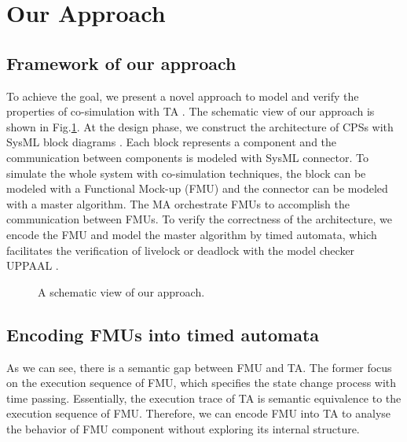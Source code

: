 \section{Our Approach}
\subsection{Framework of our approach}
To achieve the goal, we present a novel approach to model and verify the properties of co-simulation with TA \cite{AlurD94}. The schematic view of our approach is shown in Fig.\ref{paper-arc}. At the design phase, we construct the architecture of CPSs with SysML block diagrams \cite{RahimHI17}. Each block represents a component and the communication between components is modeled with SysML connector. To simulate the whole system with co-simulation techniques, the block can be modeled with a Functional Mock-up (FMU) and the connector can be modeled with a master algorithm. The MA orchestrate FMUs to accomplish the communication between FMUs. To verify the correctness of the architecture, we encode the FMU and model the master algorithm by timed automata, which facilitates the verification of livelock or deadlock with the model checker UPPAAL \cite{BehrmannDLHPYH06}.
\begin{figure}[htbp]
	\caption{A schematic view of our approach.}
	\label{paper-arc}
\end{figure}

\label{sec:fmi}
\subsection{Encoding FMUs into timed automata}
As we can see, there is a semantic gap between FMU and TA. The former focus on the execution sequence of FMU, which specifies the state change process with time passing. Essentially, the execution trace of TA is semantic equivalence to the execution sequence of FMU. Therefore, we can encode FMU into TA to analyse the behavior of FMU component without exploring its internal structure.

